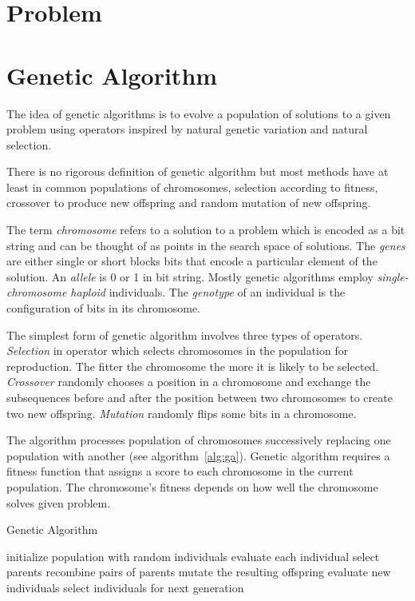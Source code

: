 \documentclass{article}
\begin{document}
\section{Problem}

\section{Genetic Algorithm}

The idea of genetic algorithms is to evolve a population of solutions
to a given problem using operators inspired by natural genetic variation
and natural selection.
\cite{mitchell1996}

There is no rigorous definition of genetic algorithm but most methods
have at least in common populations of chromosomes,
selection according to fitness, crossover to produce new offspring
and random mutation of new offspring.
\cite{mitchell1996}

The term \textit{chromosome} refers to a solution to a problem
which is encoded as a bit string
and can be thought of as points in the search space of solutions.
The \textit{genes} are either single or short blocks bits
that encode a particular element of the solution.
An \textit{allele} is 0 or 1 in bit string.
Mostly genetic algorithms employ \textit{single-chromosome haploid} individuals.
The \textit{genotype} of an individual is the configuration of bits
in its chromosome.
\cite{mitchell1996}

The simplest form of genetic algorithm involves three types of operators.
\textit{Selection} in operator which selects chromosomes in the population for
reproduction.
The fitter the chromosome the more it is likely to be selected.
\textit{Crossover} randomly chooses a position in a chromosome
and exchange the subsequences before and after the position between
two chromosomes to create two new offspring.
\textit{Mutation} randomly flips some bits in a chromosome.
\cite{mitchell1996}

The algorithm processes population of chromosomes successively replacing
one population with another (see algorithm~\ref{alg:ga}).
Genetic algorithm requires a fitness function that assigns a score to
each chromosome in the current population.
The chromosome's fitness depends on how well the chromosome solves given
problem.
\cite{mitchell1996}

\begin{algorithm}[hb]
\caption{Genetic Algorithm~\cite{eiben2003}}
\label{alg:ga}
\begin{algorithmic}
\STATE initialize population with random individuals
\STATE evaluate each individual
\STATE select parents
\STATE recombine pairs of parents
\STATE mutate the resulting offspring
\STATE evaluate new individuals
\STATE select individuals for next generation
\ENDWHILE
\end{algorithmic}
\end{algorithm}
\end{document}

